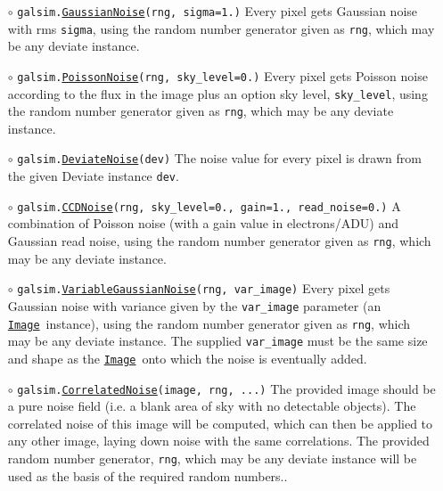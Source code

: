 \documentclass[preprint,10pt]{../../devel/modules/aastex}
\newcommand\Image{\href{http://galsim-developers.github.io/GalSim/classgalsim_1_1image_1_1_image.html}{\texttt{Image}}}
\begin{document}
\begin{itemize}
  \item[$\circ$] 
  \texttt{galsim.\href{http://galsim-developers.github.io/GalSim/classgalsim_1_1_gaussian_noise.html}{GaussianNoise}(rng, sigma=1.)}  
    \newline
    Every pixel gets Gaussian noise with rms \texttt{sigma}, using the
    random number generator given as \texttt{rng}, which may be any deviate instance.

  \item[$\circ$] 
  \texttt{galsim.\href{http://galsim-developers.github.io/GalSim/classgalsim_1_1_poisson_noise.html}{PoissonNoise}(rng, sky\_level=0.)}
    \newline 
    Every pixel gets Poisson noise according to the flux in
    the image plus an option sky level, \texttt{sky\_level}, using the
    random number generator given as \texttt{rng}, which may be any deviate instance.

  \item[$\circ$] 
  \texttt{galsim.\href{http://galsim-developers.github.io/GalSim/classgalsim_1_1_deviate_noise.html}{DeviateNoise}(dev)} 
    \newline 
    The noise
    value for every pixel is drawn from the given Deviate instance
    \texttt{dev}.

  \item[$\circ$] 
  \texttt{galsim.\href{http://galsim-developers.github.io/GalSim/classgalsim_1_1_c_c_d_noise.html}{CCDNoise}(rng, sky\_level=0., gain=1.,
    read\_noise=0.)}  
    \newline 
    A combination of Poisson noise (with a
    gain value in electrons/ADU) and Gaussian read noise, using the
    random number generator given as \texttt{rng}, which may be any deviate instance.

  \item[$\circ$] 
  \texttt{galsim.\href{http://galsim-developers.github.io/GalSim/classgalsim_1_1noise_1_1_variable_gaussian_noise.html}{VariableGaussianNoise}(rng, var\_image)}  
    \newline
    Every pixel gets Gaussian noise with variance given by the \texttt{var\_image} parameter
    (an \Image\ instance), using the
    random number generator given as \texttt{rng}, which may be any deviate instance. 
    The supplied \texttt{var\_image} must be the same size and shape as the \Image\ 
    onto which the noise is eventually added.

  \item[$\circ$] 
  \texttt{galsim.\href{http://galsim-developers.github.io/GalSim/classgalsim_1_1correlatednoise_1_1_correlated_noise.html}{CorrelatedNoise}(image, rng, ...)}  
    \newline
   The provided image should be a pure noise field (i.e. a blank area of sky with no detectable
    objects).  The correlated noise of this image will be computed, which can then be applied
    to any other image, laying down noise with the same correlations.  The provided
    random number generator, \texttt{rng}, which may be any deviate instance will be used
    as the basis of the required random numbers.. 
    
\end{itemize}
\end{document}
